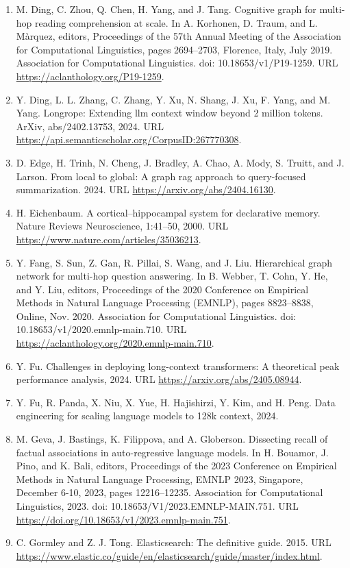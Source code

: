 \documentclass[11pt,UTF8,fontset=fandol]{ctexart}
\begin{document}
\begin{enumerate}[leftmargin=2em]
\item M. Ding, C. Zhou, Q. Chen, H. Yang, and J. Tang. Cognitive graph for multi-hop reading comprehension at scale. In A. Korhonen, D. Traum, and L. M\`arquez, editors, Proceedings of the 57th Annual Meeting of the Association for Computational Linguistics, pages 2694--2703, Florence, Italy, July 2019. Association for Computational Linguistics. doi: 10.18653/v1/P19-1259. URL \url{https://aclanthology.org/P19-1259}.
\item Y. Ding, L. L. Zhang, C. Zhang, Y. Xu, N. Shang, J. Xu, F. Yang, and M. Yang. Longrope: Extending llm context window beyond 2 million tokens. ArXiv, abs/2402.13753, 2024. URL \url{https://api.semanticscholar.org/CorpusID:267770308}.
\item D. Edge, H. Trinh, N. Cheng, J. Bradley, A. Chao, A. Mody, S. Truitt, and J. Larson. From local to global: A graph rag approach to query-focused summarization. 2024. URL \url{https://arxiv.org/abs/2404.16130}.
\item H. Eichenbaum. A cortical--hippocampal system for declarative memory. Nature Reviews Neuroscience, 1:41--50, 2000. URL \url{https://www.nature.com/articles/35036213}.
\item Y. Fang, S. Sun, Z. Gan, R. Pillai, S. Wang, and J. Liu. Hierarchical graph network for multi-hop question answering. In B. Webber, T. Cohn, Y. He, and Y. Liu, editors, Proceedings of the 2020 Conference on Empirical Methods in Natural Language Processing (EMNLP), pages 8823--8838, Online, Nov. 2020. Association for Computational Linguistics. doi: 10.18653/v1/2020.emnlp-main.710. URL \url{https://aclanthology.org/2020.emnlp-main.710}.
\item Y. Fu. Challenges in deploying long-context transformers: A theoretical peak performance analysis, 2024. URL \url{https://arxiv.org/abs/2405.08944}.
\item Y. Fu, R. Panda, X. Niu, X. Yue, H. Hajishirzi, Y. Kim, and H. Peng. Data engineering for scaling language models to 128k context, 2024.
\item M. Geva, J. Bastings, K. Filippova, and A. Globerson. Dissecting recall of factual associations in auto-regressive language models. In H. Bouamor, J. Pino, and K. Bali, editors, Proceedings of the 2023 Conference on Empirical Methods in Natural Language Processing, EMNLP 2023, Singapore, December 6-10, 2023, pages 12216--12235. Association for Computational Linguistics, 2023. doi: 10.18653/V1/2023.EMNLP-MAIN.751. URL \url{https://doi.org/10.18653/v1/2023.emnlp-main.751}.
\item C. Gormley and Z. J. Tong. Elasticsearch: The definitive guide. 2015. URL \url{https://www.elastic.co/guide/en/elasticsearch/guide/master/index.html}.

\end{enumerate}
\end{document}
